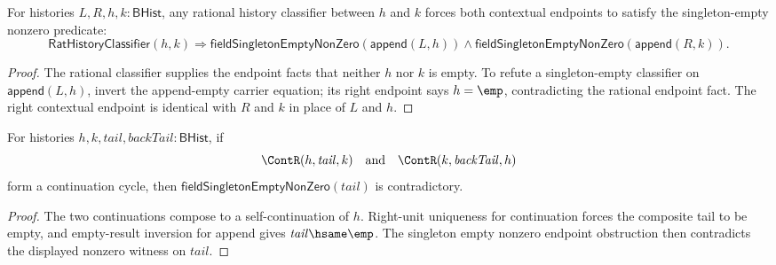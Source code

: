 \begin{theorem}
\label{thm:rat-history-classifier-field-singleton-empty-nonzero-context-endpoints}
For histories $L,R,h,k:\mathsf{BHist}$, any rational history classifier
between $h$ and $k$ forces both contextual endpoints to satisfy the
singleton-empty nonzero predicate:
$$
\mathsf{RatHistoryClassifier}(h,k)
\Longrightarrow
\mathsf{fieldSingletonEmptyNonZero}(\mathsf{append}(L,h))\land
\mathsf{fieldSingletonEmptyNonZero}(\mathsf{append}(R,k)).
$$
\end{theorem}
\begin{proof}
The rational classifier supplies the endpoint facts that neither $h$ nor $k$
is empty. To refute a singleton-empty classifier on $\mathsf{append}(L,h)$,
invert the append-empty carrier equation; its right endpoint says $h=\emp$,
contradicting the rational endpoint fact. The right contextual endpoint is
identical with $R$ and $k$ in place of $L$ and $h$.
\end{proof}




\begin{theorem}
\label{thm:field-singleton-empty-nonzero-continuation-cycle-tail-absurd}
For histories $h,k,\mathit{tail},\mathit{backTail}:\mathsf{BHist}$, if
$$
\ContR(h,\mathit{tail},k)
\quad\text{and}\quad
\ContR(k,\mathit{backTail},h)
$$
form a continuation cycle, then
$\mathsf{fieldSingletonEmptyNonZero}(\mathit{tail})$ is contradictory.
\end{theorem}
\begin{proof}
The two continuations compose to a self-continuation of $h$. Right-unit
uniqueness for continuation forces the composite tail to be empty, and
empty-result inversion for append gives $\mathit{tail}\hsame\emp$. The
singleton empty nonzero endpoint obstruction then contradicts the displayed
nonzero witness on $\mathit{tail}$.
\end{proof}

